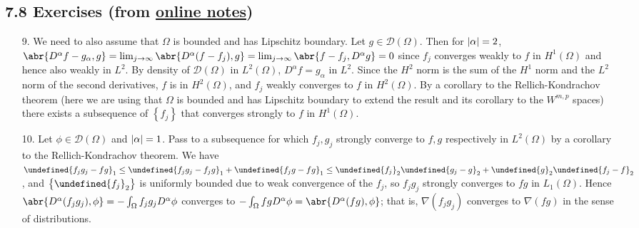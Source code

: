 \documentclass[11pt,leqno]{article}
\theoremstyle{plain}
\theoremstyle{definition}
\numberwithin{equation}{section}
\numberwithin{lem}{section}
\newcommand{\cbr}[1]{\left\{#1\right\}}
\let\norm\undefined %
\DeclarePairedDelimiter\norm{\lVert}{\rVert}
\begin{document}
\subsection*{7.8 Exercises (from \href{https://users.oden.utexas.edu/~arbogast/appMath08c.pdf}{online notes})}
\begin{enumerate}
    \item[9.] We need to also assume that $\Omega$ is bounded and has Lipschitz boundary. Let $g\in \mathcal D(\Omega)$. Then for $\abs{\alpha} = 2$, $\abr{D^\alpha f - g_\alpha,g} = \lim_{j\to\infty}\abr{D^\alpha(f-f_j),g} = \lim_{j\to\infty}\abr{f-f_j,D^\alpha g} = 0$ since $f_j$ converges weakly to $f$ in $H^1(\Omega)$ and hence also weakly in $L^2$. By density of $\mathcal D(\Omega)$ in $L^2(\Omega)$, $D^\alpha f = g_\alpha$ in $L^2$. Since the $H^2$ norm is the sum of the $H^1$ norm and the $L^2$ norm of the second derivatives, $f$ is in $H^2(\Omega)$, and $f_j$ weakly converges to $f$ in $H^2(\Omega)$. By a corollary to the Rellich-Kondrachov theorem (here we are using that $\Omega$ is bounded and has Lipschitz boundary to extend the result and its corollary to the $W^{m,p}$ spaces) there exists a subsequence of $\cbr{f_j}$ that converges strongly to $f$ in $H^1(\Omega)$.
    \item[10.] Let $\phi\in\mathcal D(\Omega)$ and $\abs{\alpha} = 1$. Pass to a subsequence for which $f_j,g_j$ strongly converge to $f,g$ respectively in $L^2(\Omega)$ by a corollary to the Rellich-Kondrachov theorem. We have $\norm{f_jg_j-fg}_1\leq \norm{f_jg_j-f_jg}_1 + \norm{f_jg-fg}_1 \leq \norm{f_j}_2\norm{g_j-g}_2 + \norm{g}_2\norm{f_j-f}_2$, and $\cbr{\norm{f_j}_2}$ is uniformly bounded due to weak convergence of the $f_j$, so $f_jg_j$ strongly converges to $fg$ in $L_1(\Omega)$. Hence $\abr{D^\alpha(f_jg_j), \phi} = -\int_\Omega f_jg_jD^\alpha \phi$ converges to $-\int_\Omega fgD^\alpha \phi = \abr{D^\alpha(fg),\phi}$; that is, $\nabla(f_jg_j)$ converges to $\nabla(fg)$ in the sense of distributions.


\end{enumerate}
\end{document}
